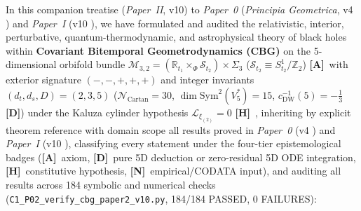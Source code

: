 \documentclass[11pt,a4paper]{article}
\newcommand{\catA}{\textbf{\textcolor{purple!80!black}{[A]}}}
\newcommand{\catD}{\textbf{\textcolor{blue!75!black}{[D]}}}
\newcommand{\catH}{\textbf{\textcolor{orange!85!black}{[H]}}}
\newcommand{\catN}{\textbf{\textcolor{teal!75!black}{[N]}}}
\theoremstyle{plain}
\theoremstyle{definition}
\theoremstyle{remark}
\numberwithin{equation}{section}
\begin{document}
In this companion treatise (\textit{Paper~II}, v10) to \textit{Paper~0} (\textit{Principia Geometrica}, v4 \cite{jimenez2026_p0}) and \textit{Paper~I} (v10 \cite{jimenez2026a}), we have formulated and audited the relativistic, interior, perturbative, quantum-thermodynamic, and astrophysical theory of black holes within \textbf{Covariant Bitemporal Geometrodynamics (CBG)} on the 5-dimensional orbifold bundle $\mathcal{M}_{3,2} = (\mathbb{R}_{t_1} \times_{\Phi} \mathcal{S}_{t_2}) \times \Sigma_3$ ($\mathcal{S}_{t_2} \equiv S^1_{t_2}/\mathbb{Z}_2$) \catA\ with exterior signature $(-,-,+,+,+)$ and integer invariants $(d_t, d_s, D) = (2, 3, 5)$ ($\mathcal{N}_{\text{Cartan}} = 30$, $\dim\mathrm{Sym}^2(V_5^*) = 15$, $c_{\text{DW}}^{-1}(5) = -\frac{1}{3}$ \catD) under the Kaluza cylinder hypothesis $\mathcal{L}_{\xi_{(2)}} = 0$ \catH\ \cite{JV_CycleII,JV_CycleIII,JV_PaperIV}, inheriting by explicit theorem reference with domain scope all results proved in \textit{Paper~0} (v4 \cite{jimenez2026_p0}) and \textit{Paper~I} (v10 \cite{jimenez2026a}), classifying every statement under the four-tier epistemological badges (\catA\ axiom, \catD\ pure 5D deduction or zero-residual 5D ODE integration, \catH\ constitutive hypothesis, \catN\ empirical/CODATA input), and auditing all results across 184 symbolic and numerical checks (\allowbreak\texttt{C1\_P02\_verify\_cbg\_paper2\_v10.py}, 184/184 PASSED, 0 FAILURES):
\end{document}
